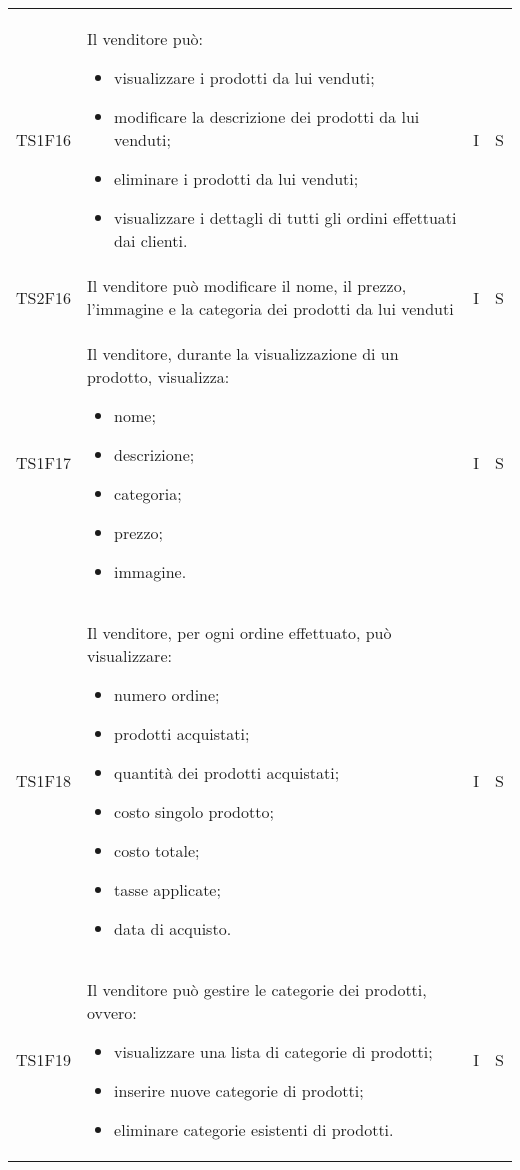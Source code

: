 {\begin{longtable}{C{2cm} C{9.6cm} C{1.5cm} C{1cm}}
TS1F16 & Il venditore può:
\begin{itemize}
	\item visualizzare i prodotti da lui venduti;
	\item modificare la descrizione dei prodotti da lui venduti;
	\item eliminare i prodotti da lui venduti;
	\item visualizzare i dettagli di tutti gli ordini effettuati dai clienti.
\end{itemize} & I & S\\

TS2F16 & Il venditore può modificare il nome, il prezzo, l'immagine e la categoria dei prodotti da lui venduti & I & S\\

TS1F17 & Il venditore, durante la visualizzazione di un prodotto, visualizza:
\begin{itemize}
	\item nome;
	\item descrizione;
	\item categoria;
	\item prezzo;
	\item immagine.
\end{itemize} & I & S\\

TS1F18 & Il venditore, per ogni ordine effettuato, può visualizzare:
\begin{itemize}
	\item numero ordine;
	\item prodotti acquistati;
	\item quantità dei prodotti acquistati;
	\item costo singolo prodotto;
	\item costo totale;
	\item tasse applicate;
	\item data di acquisto.
\end{itemize}
& I & S\\

TS1F19 & Il venditore può gestire le categorie dei prodotti, ovvero:
\begin{itemize}
	\item visualizzare una lista di categorie di prodotti;
	\item inserire nuove categorie di prodotti;
	\item eliminare categorie esistenti di prodotti.
\end{itemize}
& I & S\\






\end{longtable}}
